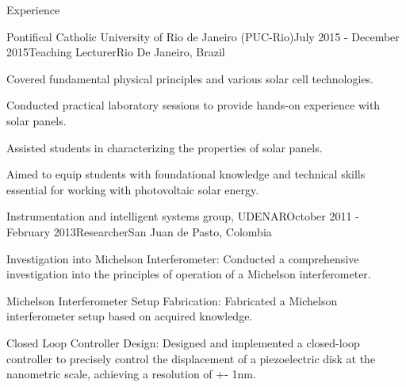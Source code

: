\documentclass{resume} %
\begin{document}
\begin{rSection}{Experience}
        \begin{rSubsection}{Pontifical Catholic University of Rio de Janeiro (PUC-Rio)}{July  2015 - December 2015}{Teaching Lecturer}{Rio De Janeiro, Brazil}
            {\normalfont
            \item Covered fundamental physical principles and various solar cell technologies.
            \item Conducted practical laboratory sessions to provide hands-on experience with solar panels.
            \item Assisted students in characterizing the properties of solar panels.
            \item Aimed to equip students with foundational knowledge and technical skills essential for working with photovoltaic solar energy.
            }
        \end{rSubsection}

        \begin{rSubsection}{Instrumentation and intelligent systems group, UDENAR}{October  2011 - February 2013}{Researcher}{San Juan de Pasto, Colombia}
            {\normalfont 
            \item Investigation into Michelson Interferometer: Conducted a comprehensive investigation into the principles of operation of a Michelson interferometer.
            \item Michelson Interferometer Setup Fabrication: Fabricated a Michelson interferometer setup based on acquired knowledge.
            \item Closed Loop Controller Design: Designed and implemented a closed-loop controller to precisely control the displacement of a piezoelectric disk at the nanometric scale, achieving a resolution of +- 1nm.
            }
        \end{rSubsection}
    \end{rSection}
    
    
\end{document}
